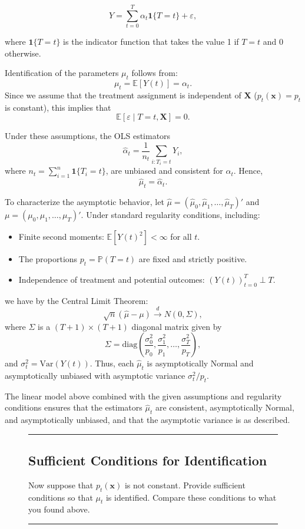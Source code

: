 \documentclass{article}
\newenvironment{colorparagraph}[1]{\par\color{#1}}{\par}
\begin{document}

$$
Y = \sum_{t=0}^T \alpha_t \textbf{1}\{T=t\} + \varepsilon,
$$

where \(\textbf{1}\{T=t\}\) is the indicator function that takes the value 1 if \(T=t\) and 0 otherwise.

Identification of the parameters \(\mu_t\) follows from:
\[
\mu_t = \mathbb{E}[Y(t)] = \alpha_t.
\]
Since we assume that the treatment assignment is independent of \(\mathbf{X}\) (\(p_t(\mathbf{x})=p_t\) is constant), this implies that
\[
\mathbb{E}[\varepsilon \mid T=t, \mathbf{X}] = 0.
\]

Under these assumptions, the OLS estimators
\[
\hat{\alpha}_t = \frac{1}{n_t} \sum_{i: T_i=t} Y_i, 
\]
where \(n_t = \sum_{i=1}^n \textbf{1}\{T_i=t\}\), are unbiased and consistent for \(\alpha_t\). Hence,
\[
\hat{\mu}_t = \hat{\alpha}_t.
\]

To characterize the asymptotic behavior, let \(\hat{\mu} = (\hat{\mu}_0, \hat{\mu}_1, \dots, \hat{\mu}_T)'\) and \(\mu = (\mu_0, \mu_1, \dots, \mu_T)'\). Under standard regularity conditions, including:
\begin{itemize}
\item Finite second moments: \(\mathbb{E}[Y(t)^2] < \infty\) for all \(t\).
\item The proportions \(p_t = \mathbb{P}(T=t)\) are fixed and strictly positive.
\item Independence of treatment and potential outcomes: \( (Y(t))_{t=0}^T \perp T \).
\end{itemize}
we have by the Central Limit Theorem:
\[
\sqrt{n} (\hat{\mu} - \mu) \xrightarrow{d} N(0, \Sigma),
\]
where \(\Sigma\) is a \((T+1)\times(T+1)\) diagonal matrix given by
\[
\Sigma = \mathrm{diag}\left(\frac{\sigma_0^2}{p_0}, \frac{\sigma_1^2}{p_1}, \dots, \frac{\sigma_T^2}{p_T}\right),
\]
and \(\sigma_t^2 = \mathrm{Var}(Y(t))\). Thus, each \(\hat{\mu}_t\) is asymptotically Normal and asymptotically unbiased with asymptotic variance \(\sigma_t^2 / p_t\).

The linear model above combined with the given assumptions and regularity conditions ensures that the estimators \(\hat{\mu}_t\) are consistent, asymptotically Normal, and asymptotically unbiased, and that the asymptotic variance is as described.
  
\begin{figure}[H]
  \begin{colorparagraph}{questioncolor}
  \rule{\textwidth}{0.5pt}
  \label{q1b}
  \subsection{Sufficient Conditions for Identification}
  
  Now suppose that \( p_t(\mathbf{x}) \) is not constant. Provide sufficient conditions so that \( \mu_t \) is identified. Compare these conditions to what you found above.
  
  \rule{\textwidth}{0.5pt}
  \end{colorparagraph}
\end{figure}
\end{document}

